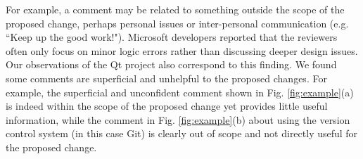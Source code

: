 
For example, a comment may be related to something outside the scope of the proposed change, perhaps personal issues or inter-personal communication (e.g. ``Keep up the good work!").
Microsoft developers reported that the reviewers often only focus on minor logic errors rather than discussing deeper design\cite{Bacchelli2013a} issues.
Our observations of the Qt project also correspond to this finding.
We found some comments are superficial and unhelpful to the proposed changes.
For example, the superficial and unconfident comment shown in Fig. \ref{fig:example}(a) is indeed within the scope of the proposed change yet provides little useful information,
while the comment in Fig. \ref{fig:example}(b) about using the version control system (in this case Git) is clearly out of scope and not directly useful for the proposed change. 



